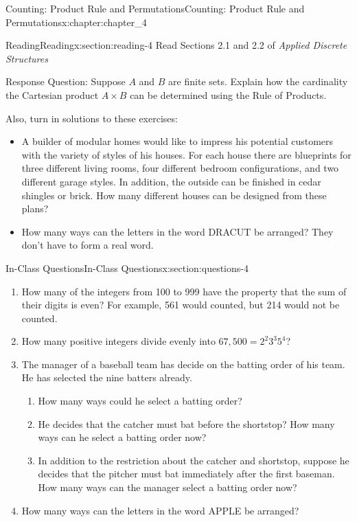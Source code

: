\documentclass[oneside,10pt,]{book}
\numberwithin{equation}{section}
\begin{document}
\begin{chapterptx}{Counting: Product Rule and Permutations}{}{Counting: Product Rule and Permutations}{}{}{x:chapter:chapter_4}
\index{}%
%
%
\typeout{************************************************}
\typeout{************************************************}
%
\begin{sectionptx}{Reading}{}{Reading}{}{}{x:section:reading-4}
Read Sections 2.1 and 2.2 of \emph{Applied Discrete Structures}%
\par
Response Question:  Suppose \(A\) and \(B\) are finite sets.  Explain how the cardinality the Cartesian product \(A \times B\) can be determined using the Rule of Products.%
\par
Also, turn in solutions to these exercises:%
\begin{itemize}[label=\textbullet]
\item{}A builder of modular homes would like to impress his potential customers with the variety of styles of his houses. For each house there are blueprints for three different living rooms, four different bedroom configurations, and two different garage styles. In addition, the outside can be finished in cedar shingles or brick. How many different houses can be designed from these plans?%
\item{}How many ways can the letters in the word DRACUT be arranged? They don't have to form a real word.%
\end{itemize}
%
\end{sectionptx}
%
%
\typeout{************************************************}
\typeout{************************************************}
%
\begin{sectionptx}{In-Class Questions}{}{In-Class Questions}{}{}{x:section:questions-4}
%
\begin{enumerate}[label=\arabic*.]
\item{}How many of the integers from 100 to 999 have the property that the sum of their digits is even? For example, 561 would counted, but 214 would not be counted.%
\item{}How many positive integers divide evenly into \(67,500=2^2 3^3 5^4\)?%
\item{}The manager of a baseball team has decide on the batting order of his team.  He has selected the nine batters already.%
\begin{enumerate}[label=(\alph*)]
\item{}How many ways could he select a batting order?%
\item{}He decides that the catcher must bat before the shortstop?  How many ways can he select a batting order now?%
\item{}In addition to the restriction about the catcher and shortstop, suppose he decides that the pitcher must bat immediately after the first baseman.  How many ways can the manager select a batting order now?%
\end{enumerate}
%
\item{}How many ways can the letters in the word APPLE be arranged?%
\end{enumerate}
%
\end{sectionptx}
\end{chapterptx}
\end{document}
